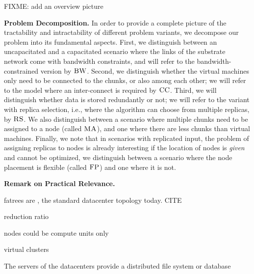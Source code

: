 \documentclass[9pt,twocolumn]{scrartcl}
\newcommand{\CC}{\textsc{CC}}
\newcommand{\FP}{\textsc{FP}}
\newcommand{\RS}{\textsc{RS}}
\newcommand{\BW}{\textsc{BW}}
\newcommand{\MA}{\textsc{MA}}
\begin{document}
FIXME: add an overview picture

\textbf{Problem Decomposition.}
In order to provide a complete picture of the tractability and intractability of different
problem variants, we decompose our problem into its fundamental aspects.
First, we distinguish between an uncapacitated and a capacitated scenario where the links of the substrate network come with bandwidth
constraints, and will refer to the bandwidth-constrained version by $\BW$.
Second, we distinguish whether the virtual machines only need to be connected to the chunks, or also
among each other; we will refer to the model where an inter-connect is required
by $\CC$.
Third, we will distinguish whether data is stored redundantly or not; we will refer to the variant
with replica selection, i.e., where the algorithm can choose from multiple replicas, by $\RS$.
We also distinguish between a scenario where multiple chunks need to be assigned to a node
(called $\MA$), and one where there are less chunks than virtual machines. 
Finally, we note that in scenarios with replicated input, the problem of assigning replicas
to nodes is already interesting if the location of nodes is \emph{given} and cannot be optimized,
we distinguish between a scenario where the node placement is flexible (called $\FP$) and one where
it is not.

\textbf{Remark on Practical Relevance.}


fatrees are , the standard datacenter topology today. CITE

reduction ratio

nodes could be compute units only

virtual clusters

The servers of the datacenters provide a distributed file system or database

%
%
\end{document}
